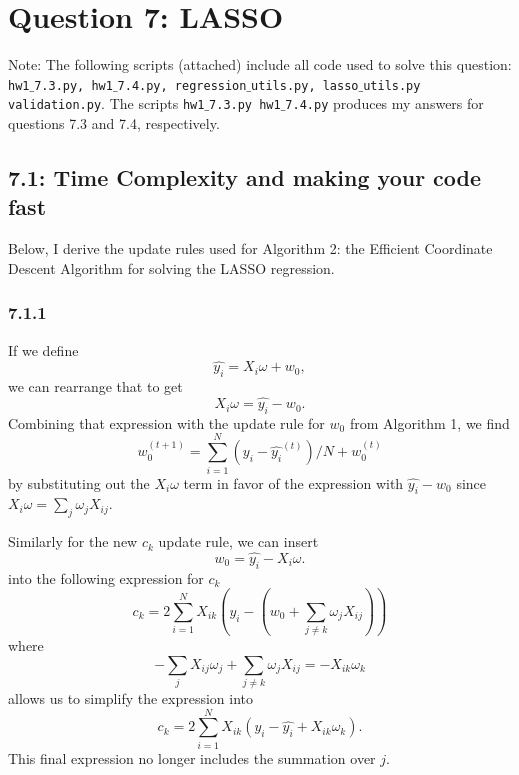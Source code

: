 \documentclass[12pt]{amsart}
\begin{document}
\section*{Question 7: LASSO}

Note: The following scripts (attached) include all code used to solve this question: {\tt hw1$\_$7.3.py, hw1$\_$7.4.py, regression$\_$utils.py, lasso$\_$utils.py  validation.py}.  The scripts {\tt hw1$\_$7.3.py  hw1$\_$7.4.py} produces my answers for questions 7.3 and 7.4, respectively.  

\subsection*{7.1: Time Complexity and making your code fast}

Below, I derive the update rules used for Algorithm 2: the Efficient Coordinate Descent Algorithm for solving the LASSO regression.

\subsubsection*{7.1.1}
If we define
\begin{equation}
\hat{y_i} = X_i \omega + w_0,
\end{equation}
we can rearrange that to get 
\begin{equation}
X_i \omega = \hat{y_i} - w_0.
\end{equation}
Combining that expression with the update rule for $w_0$ from Algorithm 1, we find
\begin{equation}
w_0^{(t+1)} = \sum_{i = 1}^N (y_i - \hat{y_i}^{(t)})/N + w_0^{(t)}
\end{equation}
by substituting out the $X_i \omega$ term in favor of the expression with $\hat{y_i} - w_0$ since $X_i \omega = \sum_j \omega_j X_{ij}$.

Similarly for the new $c_k$ update rule, we can insert
\begin{equation}
w_0 = \hat{y_i} - X_i \omega.
\end{equation}
into the following expression for $c_k$
\begin{equation}
c_k = 2 \sum_{i=1}^N X_{ik}(y_i - (w_0 + \sum_{j \neq k}\omega_j X_{ij}))
\end{equation}
where 
\begin{equation}
-\sum_j X_{ij}\omega_j + \sum_{j \neq k}\omega_j X_{ij} = -X_{ik}\omega_k
\end{equation}
allows us to simplify the expression into 
\begin{equation}
c_k = 2 \sum_{i=1}^N X_{ik}(y_i - \hat{y_i} + X_{ik}\omega_k).
\end{equation}
This final expression no longer includes the summation over $j$.
\end{document}

